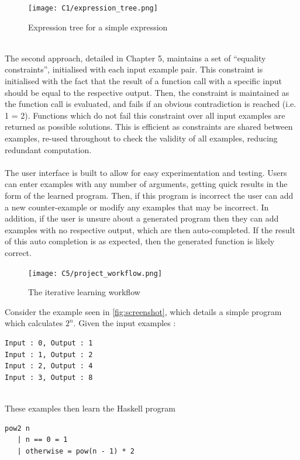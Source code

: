 \begin{figure}[h!]
\centering
\texttt{[image: C1/expression\_tree.png]}
\caption{Expression tree for a simple expression}
\label{fig:expr_tree}
\end{figure}
\mbox{}\\
The second approach, detailed in Chapter 5, maintains a set of ``equality constraints'', initialised with each input example pair. This constraint is initialised with the fact that the result of a function call with a specific input should be equal to the respective output. Then, the constraint is maintained as the function call is evaluated, and fails if an obvious contradiction is reached (i.e. 1 = 2). Functions which do not fail this constraint over all input examples are returned as possible solutions. This is efficient as constraints are shared between examples, re-used throughout to check the validity of all examples, reducing redundant computation. \\ \\
The user interface is built to allow for easy experimentation and testing. Users can enter examples with any number of arguments, getting quick results in the form of the learned program. Then, if this program is incorrect the user can add a new counter-example or modify any examples that may be incorrect. In addition, if the user is unsure about a generated program then they can add examples with no respective output, which are then auto-completed. If the result of this auto completion is as expected, then the generated function is likely correct.

\begin{figure}[h!]
\centering
\texttt{[image: C5/project\_workflow.png]}
\caption{The iterative learning workflow}
\end{figure}
Consider the example seen in \ref{fig:screenshot}, which details a simple program which calculates $2^n$. Given the input examples :\\
\begin{lstlisting}
Input : 0, Output : 1
Input : 1, Output : 2
Input : 2, Output : 4
Input : 3, Output : 8
\end{lstlisting}
\mbox{}\\
These examples then learn the Haskell program \\
\begin{lstlisting}
pow2 n
   | n == 0 = 1
   | otherwise = pow(n - 1) * 2
\end{lstlisting}
\mbox{}\\

